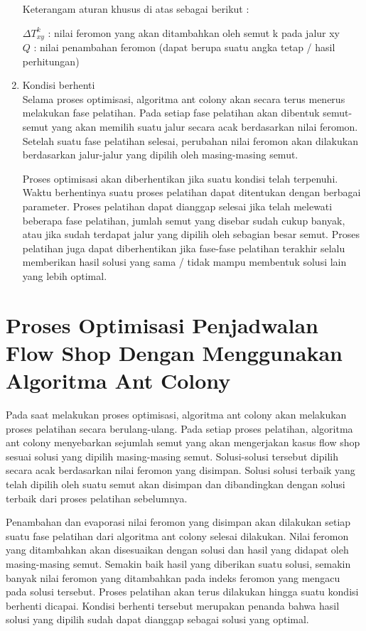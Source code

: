 \begin{enumerate}
	
	Keterangam aturan khusus di atas sebagai berikut :
	
	$\Delta T_{xy}^k$ : nilai feromon yang akan ditambahkan oleh semut k pada jalur xy\\
	$Q$ 				: nilai penambahan feromon (dapat berupa suatu angka tetap / hasil perhitungan)\\
	
	\item Kondisi berhenti\\
	Selama proses optimisasi, algoritma ant colony akan secara terus menerus melakukan fase pelatihan.
	Pada setiap fase pelatihan akan dibentuk semut-semut yang akan memilih suatu jalur secara acak
	berdasarkan nilai feromon. Setelah suatu fase pelatihan selesai, perubahan nilai feromon akan
	dilakukan berdasarkan jalur-jalur yang dipilih oleh masing-masing semut.
	
	Proses optimisasi akan diberhentikan jika suatu kondisi telah terpenuhi. Waktu berhentinya
	suatu proses pelatihan dapat ditentukan dengan berbagai parameter. Proses pelatihan dapat dianggap
	selesai jika telah melewati beberapa fase pelatihan, jumlah semut yang disebar sudah cukup
	banyak, atau jika sudah terdapat jalur yang dipilih oleh sebagian besar semut. Proses pelatihan
	juga dapat diberhentikan jika fase-fase pelatihan terakhir selalu memberikan hasil solusi yang sama
	/ tidak mampu membentuk solusi lain yang lebih optimal.
\end{enumerate}

\section{Proses Optimisasi Penjadwalan Flow Shop Dengan Menggunakan Algoritma Ant Colony}

	Pada saat melakukan proses optimisasi, algoritma ant colony akan melakukan proses pelatihan
	secara berulang-ulang. Pada setiap proses pelatihan, algoritma ant colony menyebarkan sejumlah
	semut yang akan mengerjakan kasus flow shop sesuai solusi yang dipilih masing-masing
	semut. Solusi-solusi tersebut dipilih secara acak berdasarkan nilai feromon yang disimpan. Solusi solusi
	terbaik yang telah dipilih oleh suatu semut akan disimpan dan dibandingkan dengan solusi
	terbaik dari proses pelatihan sebelumnya.
	
	Penambahan dan evaporasi nilai feromon yang disimpan akan dilakukan setiap suatu fase pelatihan
	dari algoritma ant colony selesai dilakukan. Nilai feromon yang ditambahkan akan disesuaikan
	dengan solusi dan hasil yang didapat oleh masing-masing semut. Semakin baik hasil yang diberikan
	suatu solusi, semakin banyak nilai feromon yang ditambahkan pada indeks feromon yang mengacu
	pada solusi tersebut. Proses pelatihan akan terus dilakukan hingga suatu kondisi berhenti dicapai.
	Kondisi berhenti tersebut merupakan penanda bahwa hasil solusi yang dipilih sudah dapat dianggap
	sebagai solusi yang optimal.
	
